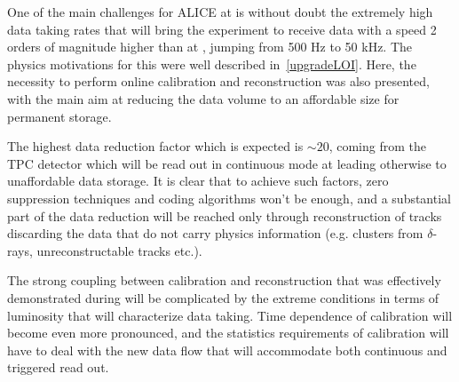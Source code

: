 
One of the main challenges for ALICE at  is without doubt the extremely high data taking rates that will 
bring the experiment to receive data with a speed 2 orders of magnitude higher than at , 
jumping from 500 Hz to 50 kHz. The physics motivations for this were well described in~\ref{upgradeLOI}. Here,
the necessity to perform online calibration and reconstruction was also presented, with the main aim at 
reducing the data volume to an affordable size for permanent storage. 

The highest data reduction factor which
is expected is $\sim 20$, coming from the TPC detector which will be read out in continuous mode at  leading
otherwise to unaffordable data storage.
It is clear that to achieve such factors, zero suppression techniques and coding algorithms won't be enough, and 
a substantial part of the data reduction will be reached only through reconstruction of tracks discarding the data
that do not carry physics information (e.g. clusters from
$\delta$-rays, unreconstructable tracks etc.). 

The strong coupling between calibration and reconstruction that was effectively demonstrated during  will 
be complicated by the extreme conditions in terms of luminosity that will characterize  data taking. Time
dependence of calibration will become even more pronounced, and the statistics requirements of calibration 
will have to deal with the new data flow that will accommodate both continuous and triggered read out.  

